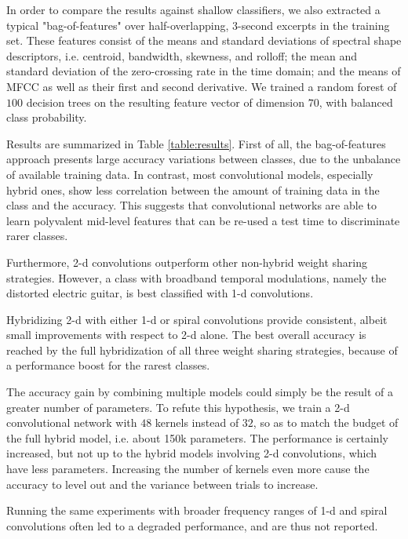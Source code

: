 \documentclass{article}
\makeatletter
\newcommand*{\ie}{i.e.\@\xspace}
\makeatother
\begin{document}
In order to compare the results against shallow classifiers, we also extracted a typical
"bag-of-features" over half-overlapping, 3-second excerpts in the training set.
These features consist of the means and standard
deviations of spectral shape descriptors, \ie centroid, bandwidth, skewness,
and rolloff; the mean and standard deviation of the zero-crossing rate in the time domain;
and the means of MFCC as well as their first and second derivative.
We trained a random forest of $100$ decision trees on the resulting feature vector
of dimension $70$, with balanced class probability.

Results are summarized in Table \ref{table:results}.
First of all, the bag-of-features approach presents large accuracy variations
between classes, due to the unbalance of available training data.
In contrast, most convolutional models, especially hybrid ones, show less correlation
between the amount of training data in the class and the accuracy.
This suggests that convolutional networks are able to learn polyvalent
mid-level features that can be re-used a test time to discriminate rarer classes.

Furthermore, 2-d convolutions outperform other non-hybrid
weight sharing strategies. However, a class with broadband
temporal modulations, namely the distorted electric guitar, is best classified
with 1-d convolutions.

Hybridizing 2-d with either 1-d or spiral convolutions provide consistent, albeit
small improvements with respect to 2-d alone. The best overall accuracy is reached
by the full hybridization of all three weight sharing strategies, because of a performance boost for the rarest classes.

The accuracy gain by combining multiple models could simply be the result of
a greater number of parameters. To refute this hypothesis, we train a 2-d convolutional
network with $48$ kernels instead of $32$, so as to match the budget of the full hybrid model, \ie about 150k parameters. The performance is certainly increased, but not up to the hybrid models involving 2-d convolutions, which have less parameters. Increasing the number of kernels even more cause the accuracy to level out and the
variance between trials to increase.

Running the same experiments with broader frequency ranges of 1-d and spiral convolutions often led to a degraded performance, and are thus not reported.
\end{document}
